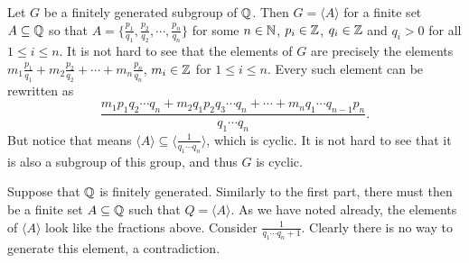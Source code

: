 \begin{solution}
	Let $G$ be a finitely generated subgroup of $\mathbb{Q}$. Then $G = \langle A \rangle$ for a finite set $A \subseteq \mathbb{Q}$ so that $A = \{ \frac{p_1}{q_1}, \frac{p_2}{q_2}, \cdots, \frac{p_n}{q_n} \}$ for some $n \in \mathbb{N}$, $p_i \in \mathbb{Z}$, $q_i \in \mathbb{Z}$ and $q_i > 0$ for all $1 \leq i \leq n$. It is not hard to see that the elements of $G$ are precisely the elements $m_1 \frac{p_1}{q_1} + m_2 \frac{p_2}{q_2} + \cdots + m_n \frac{p_n}{q_n}$, $m_i \in \mathbb{Z}$ for $1 \leq i \leq n$. Every such element can be rewritten as
	\[
		\frac{m_1 p_1 q_2 \cdots q_n + m_2 q_1 p_2 q_3 \cdots q_n + \cdots + m_n q_1 \cdots q_{n-1} p_n }{q_1 \cdots q_n} \text{.}
	\]
	But notice that means $\langle A \rangle \subseteq \langle \frac{1}{q_1 \cdots q_n} \rangle$, which is cyclic. It is not hard to see that it is also a subgroup of this group, and thus $G$ is cyclic.
	
	Suppose that $\mathbb{Q}$ is finitely generated. Similarly to the first part, there must then be a finite set $A \subseteq \mathbb{Q}$ such that $Q = \langle A \rangle$. As we have noted already, the elements of $\langle A \rangle$ look like the fractions above. Consider $\frac{1}{q_1 \cdots q_n + 1}$. Clearly there is no way to generate this element, a contradiction.
\end{solution}

\begin{problem}
\end{problem}


